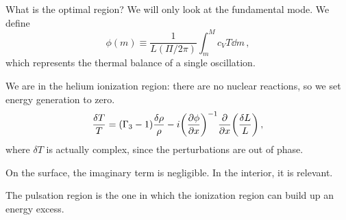 \documentclass[main.tex]{subfiles}
\begin{document}
What is the optimal region? We will only look  at the fundamental mode. We define
%
\begin{equation}
  \phi (m) \equiv \frac{1}{L(\Pi / 2 \pi )}\int_m^M c_V T \dd{m} 
\,,
\end{equation}
%
which represents the thermal balance of a single oscillation.

We are in the helium ionization region: there are no nuclear reactions, so we set energy generation to zero. 
%
\begin{equation}
  \frac{\delta T}{T} = (\Gamma_3 -1 ) \frac{\delta \rho }{\rho } - i \qty(\pdv{\phi }{x} )^{-1} \pdv{}{x} \qty(\frac{\delta L}{L})
\,,
\end{equation}
%
where \(\delta T\) is actually complex, since the perturbations are out of phase.

On the surface, the imaginary term is negligible. In the interior, it is relevant.

The pulsation region is the one in which the ionization region can build up an energy excess. 
\end{document}
